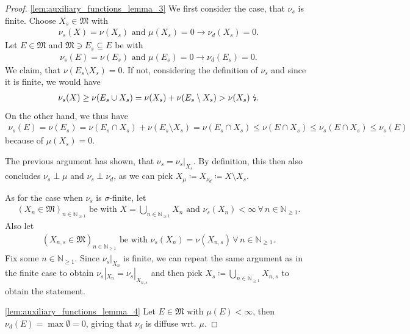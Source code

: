 \documentclass[10pt, leqno]{amsart}
\theoremstyle{definition}
\theoremstyle{remark}
\begin{document}
\begin{proof}
        \ref{lem:auxiliary_functions_lemma_3} We first consider the case, that \(\nu_s\) is finite. Choose \(X_s \in \mathfrak{M}\) with
        \begin{align}
            \nu_s(X) = \nu(X_s) \text{ and } \mu(X_s) = 0 \rightarrow \nu_d(X_s) = 0.
        \end{align}
        Let \(E \in \mathfrak{M}\) and \(\mathfrak{M} \ni E_s \subseteq E\) be with
        \begin{align}
            \nu_s(E) = \nu(E_s) \text{ and } \mu(E_s) = 0 \rightarrow \nu_d(E_s) = 0.
        \end{align}
        We claim, that \(\nu(E_s \setminus X_s) = 0\). If not, considering the definition of \(\nu_s\) and since it is finite, we would have
        \begin{align}
            \nu_s(X) \geq \nu(E_s \cup X_s) = \nu(X_s) + \nu(E_s \setminus X_s) > \nu(X_s) \text{ \lightning.}
        \end{align}
        On the other hand, we thus have
        \begin{align}
            \nu_s(E) = \nu(E_s) = \nu(E_s \cap X_s) + \nu(E_s \setminus X_s) = \nu(E_s \cap X_s) \leq \nu(E \cap X_s) \leq \nu_s(E \cap X_s) \leq \nu_s(E)
        \end{align}
        because of \(\mu(X_s) = 0\).

        \phantom{}

        The previous argument has shown, that \(\nu_s = \nu_s|_{X_s}\). By definition, this then also concludes \(\nu_s \perp \mu\) and \(\nu_s \perp \nu_d\), as we can pick \(X_{\mu} \coloneqq X_{\nu_d} \coloneqq X \setminus X_s\).

        \phantom{}

        As for the case when \(\nu_s\) is \(\sigma\)-finite, let
        \begin{align}
            (X_n \in \mathfrak{M})_{n \in \mathbb{N}_{\geq 1}} \text{ be with } X = \bigcup_{n \in \mathbb{N}_{\geq 1}} X_n \text{ and } \nu_s(X_n) < \infty \, \forall \, n \in \mathbb{N}_{\geq 1}.
        \end{align}
        Also let
        \begin{align}
            (X_{n, s} \in \mathfrak{M})_{n \in \mathbb{N}_{\geq 1}} \text{ be with } \nu_s(X_n) = \nu(X_{n, s}) \, \forall \, n \in \mathbb{N}_{\geq 1}.
        \end{align}
        Fix some \(n \in \mathbb{N}_{\geq 1}\). Since \(\nu_s|_{X_n}\) is finite, we can repeat the same argument as in the finite case to obtain \(\nu_s|_{X_n} = \nu_s|_{X_{n, s}}\) and then pick \(X_s \coloneqq \bigcup_{n \in \mathbb{N}_{\geq 1}} X_{n, s}\) to obtain the statement.

        \ref{lem:auxiliary_functions_lemma_4} Let \(E \in \mathfrak{M}\) with \(\mu(E) < \infty\), then \(\nu_d(E) = \max\emptyset = 0\), giving that \(\nu_d\) is diffuse wrt. \(\mu\).
    \end{proof}
\end{document}
